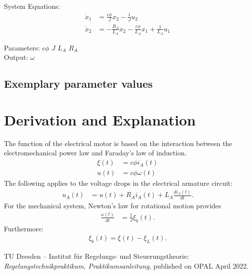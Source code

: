 \documentclass[10pt,a4paper]{article}
\begin{document}
	\noindent System Equations:			
	\begin{subequations}
	\begin{align}
		\dot{x}_1 &= \frac{c\phi}{J}x_2 - \frac{1}{J}u_2 \\
		\dot{x}_2 &= -\frac{R_A}{L_A}x_2 - \frac{c\phi}{L_A}x_1 + \frac{1}{L_A}u_1
	\end{align}
	\end{subequations}

	\noindent
	Parameters: $c\phi$ $J$ $L_A$ $R_A$%
	\\
	Output: $\omega$ \\ %
	

	
	\subsection{Exemplary parameter values}
	

	
	\section{Derivation and Explanation} %
	The function of the electrical motor is based on the interaction between the electromechanical power law and Faraday's law of induction.
	\begin{align}
		\xi (t) &= c\phi i_A(t) \\
		u(t) &= c\phi \omega(t)
	\end{align}
	The following applies to the voltage drops in the electrical armature circuit: 
	\begin{align}
		u_A(t) &= u(t) + R_A i_A(t) + L_A\frac{di_A(t)}{dt}. 
	\end{align}
	For the mechanical system, Newton's law for rotational motion provides
	\begin{align}
		\frac{\omega(t)}{dt} &= \frac{1}{J}\xi_b(t). 
	\end{align}
	Furthermore: 
	\begin{align}
		\xi_b(t) = \xi(t) - \xi_L(t). 
	\end{align}
	
	\begin{thebibliography}{10}		
		TU Dresden – Institut für Regelungs- und Steuerungstheorie: 
		\textit{Regelungstechnikpraktikum, Praktikumsanleitung}, published on OPAL April 2022.
	\end{thebibliography}
\end{document}
